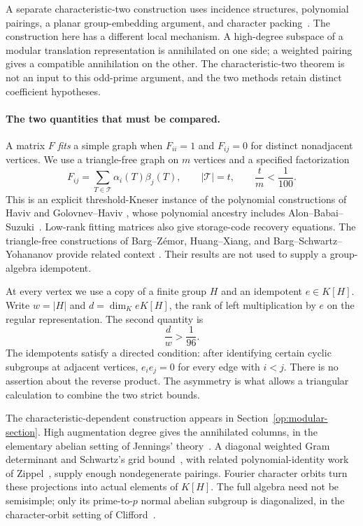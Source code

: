 A separate characteristic-two construction uses incidence structures,
polynomial pairings, a planar group-embedding argument, and character
packing~\cite[Theorem~1.1]{OpenAICharacteristicTwo2026}.
The construction here has a different local mechanism. A high-degree
subspace of a modular translation representation is annihilated on one
side; a weighted pairing gives a compatible annihilation on the other.
The characteristic-two theorem is not an input to this odd-prime
argument, and the two methods retain distinct coefficient hypotheses.

\paragraph{The two quantities that must be compared.}
A matrix $F$ \emph{fits} a simple graph when $F_{ii}=1$ and $F_{ij}=0$
for distinct nonadjacent vertices. We use a triangle-free graph on $m$
vertices and a specified factorization
\[
 F_{ij}=\sum_{T\in\mathcal T}\alpha_i(T)\beta_j(T),\qquad
 |\mathcal T|=t,\qquad \frac{t}{m}<\frac1{100}.
\]
This is an explicit threshold-Kneser instance of the polynomial
constructions of Haviv and Golovnev--Haviv
\cite[Proposition~13]{Haviv2018Theta}
\cite[Theorem~3.2 and Lemma~3.5]{GolovnevHaviv2022}, whose polynomial
ancestry includes Alon--Babai--Suzuki~\cite{AlonBabaiSuzuki1991}.
Low-rank fitting matrices also give storage-code recovery equations.
The triangle-free constructions of Barg--Z\'emor, Huang--Xiang, and
Barg--Schwartz--Yohananov provide related context
\cite{BargZemor2022,HuangXiang2023,BargSchwartzYohananov2024}.
Their results are not used to supply a group-algebra idempotent.

At every vertex we use a copy of a finite group $H$ and an idempotent
$e\in K[H]$. Write $w=|H|$ and $d=\dim_K eK[H]$, the rank of left
multiplication by $e$ on the regular representation. The second quantity
is
\[
 \frac d w>\frac1{96}.
\]
The idempotents satisfy a directed condition: after identifying certain
cyclic subgroups at adjacent vertices, $e_i e_j=0$ for every edge with
$i<j$. There is no assertion about the reverse product. The asymmetry is
what allows a triangular calculation to combine the two strict bounds.

The characteristic-dependent construction appears in
Section~\ref{op:modular-section}. High augmentation degree gives the
annihilated columns, in the elementary abelian setting of
Jennings' theory~\cite{Jennings1941}. A diagonal weighted Gram determinant
and Schwartz's grid bound~\cite[Lemma~1 and Corollary~1]{Schwartz1980},
with related polynomial-identity work of Zippel~\cite{Zippel1979}, supply
enough nondegenerate pairings. Fourier character orbits turn these
projections into actual elements of $K[H]$. The full algebra need not
be semisimple; only its prime-to-$p$ normal abelian subgroup is
diagonalized, in the character-orbit setting of
Clifford~\cite{Clifford1937Announcement}.

